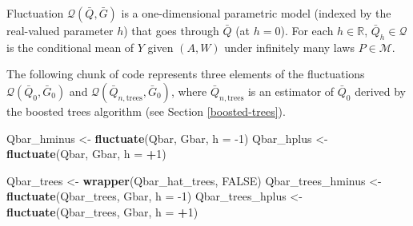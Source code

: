 \documentclass[11pt,openright,twoside]{book}
\newenvironment{Shaded}{\begin{snugshade}}{\end{snugshade}}
\newcommand{\DataTypeTok}[1]{\textcolor[rgb]{0.13,0.29,0.53}{#1}}
\newcommand{\DecValTok}[1]{\textcolor[rgb]{0.00,0.00,0.81}{#1}}
\newcommand{\KeywordTok}[1]{\textcolor[rgb]{0.13,0.29,0.53}{\textbf{#1}}}
\newcommand{\NormalTok}[1]{#1}
\newcommand{\OperatorTok}[1]{\textcolor[rgb]{0.81,0.36,0.00}{\textbf{#1}}}
\newcommand{\OtherTok}[1]{\textcolor[rgb]{0.56,0.35,0.01}{#1}}
\newcommand{\StringTok}[1]{\textcolor[rgb]{0.31,0.60,0.02}{#1}}
\newcommand{\bbR}{\mathbb{R}}
\newcommand{\calM}{\mathcal{M}}
\newcommand{\calQ}{\mathcal{Q}}
\newcommand{\Gbar}{\bar{G}}
\newcommand{\Qbar}{\bar{Q}}
\theoremstyle{definition}
\theoremstyle{definition}
\theoremstyle{definition}
\theoremstyle{remark}
\begin{document}
Fluctuation \(\calQ(\Qbar,\Gbar)\) is a one-dimensional parametric model
(indexed by the real-valued parameter \(h\)) that goes through \(\Qbar\) (at
\(h=0\)). For each \(h \in \bbR\), \(\Qbar_{h} \in \calQ\) is the conditional mean
of \(Y\) given \((A,W)\) under infinitely many laws \(P \in \calM\).

The following chunk of code represents three elements of the fluctuations
\(\calQ(\Qbar_{0}, \Gbar_{0})\) and \(\calQ(\Qbar_{n,\text{trees}}, \Gbar_{0})\),
where \(\Qbar_{n,\text{trees}}\) is an estimator of \(\Qbar_{0}\) derived by the
boosted trees algorithm (see Section \ref{boosted-trees}).



\begin{Shaded}
\begin{Highlighting}[]
\NormalTok{Qbar_hminus <-}\StringTok{ }\KeywordTok{fluctuate}\NormalTok{(Qbar, Gbar, }\DataTypeTok{h =} \DecValTok{-1}\NormalTok{)}
\NormalTok{Qbar_hplus <-}\StringTok{ }\KeywordTok{fluctuate}\NormalTok{(Qbar, Gbar, }\DataTypeTok{h =} \OperatorTok{+}\DecValTok{1}\NormalTok{)}

\NormalTok{Qbar_trees <-}\StringTok{ }\KeywordTok{wrapper}\NormalTok{(Qbar_hat_trees, }\OtherTok{FALSE}\NormalTok{)}
\NormalTok{Qbar_trees_hminus <-}\StringTok{ }\KeywordTok{fluctuate}\NormalTok{(Qbar_trees, Gbar, }\DataTypeTok{h =} \DecValTok{-1}\NormalTok{)}
\NormalTok{Qbar_trees_hplus <-}\StringTok{ }\KeywordTok{fluctuate}\NormalTok{(Qbar_trees, Gbar, }\DataTypeTok{h =} \OperatorTok{+}\DecValTok{1}\NormalTok{)}


\end{Highlighting}
\end{Shaded}
\end{document}
